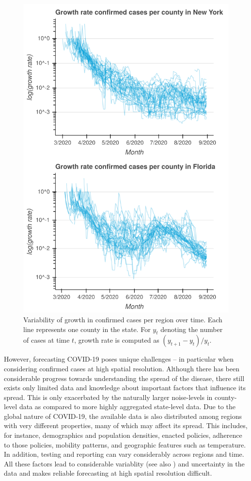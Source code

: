 \documentclass{article}
\begin{document}
\begin{figure}[t]
  \centering
\includegraphics[width=.8\columnwidth]{img/growth_example.png}
\caption{\label{fig:county-variability}Variability of growth in confirmed cases per region over time. Each line represents one county in the state. For \(y_t\) denoting the number of cases at time \(t\), growth rate is computed as \((y_{t+1} - y_t)/y_t\).}
\end{figure}

However, forecasting COVID-19 poses unique challenges -- in particular when
considering confirmed cases at high spatial resolution. Although there has been
considerable progress towards understanding the spread of the disease, there
still exists only limited data and knowledge about important factors that
influence its spread. This is only exacerbated by the naturally larger
noise-levels in county-level data as compared to more highly aggregated state-level
data. Due to the global nature of COVID-19, the available data is also
distributed among regions with very different properties, many of which may
affect its spread. This includes, for instance, demographics and population
densities, enacted policies, adherence to those policies, mobility patterns, and
geographic features such as temperature. In addition, testing and reporting can
vary considerably across regions and time. All these factors lead to
considerable variablity (see also ) and uncertainty in
the data and makes reliable forecasting at high spatial resolution difficult.
\end{document}
